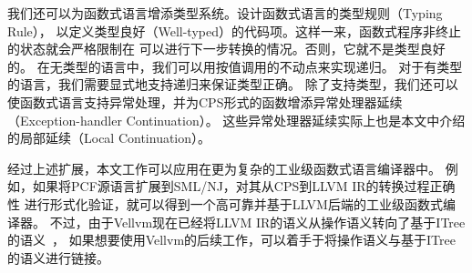 我们还可以为函数式语言增添类型系统。设计函数式语言的类型规则（Typing Rule），
以定义类型良好（Well-typed）的代码项。这样一来，函数式程序非终止的状态就会严格限制在
可以进行下一步转换的情况。否则，它就不是类型良好的。
在无类型的语言中，我们可以用按值调用的不动点来实现递归。
对于有类型的语言，我们需要显式地支持递归来保证类型正确。
除了支持类型，我们还可以使函数式语言支持异常处理，并为CPS形式的函数增添异常处理器延续（Exception-handler Continuation）。
这些异常处理器延续实际上也是本文中介绍的局部延续（Local Continuation）。

经过上述扩展，本文工作可以应用在更为复杂的工业级函数式语言编译器中。
例如，如果将PCF源语言扩展到SML/NJ，对其从CPS到LLVM IR的转换过程正确性
进行形式化验证，就可以得到一个高可靠并基于LLVM后端的工业级函数式编译器。
不过，由于Vellvm现在已经将LLVM IR的语义从操作语义转向了基于ITree的语义~\cite{itree2019,itreevellvm2021}，
如果想要使用Vellvm的后续工作，可以着手于将操作语义与基于ITree的语义进行链接。
